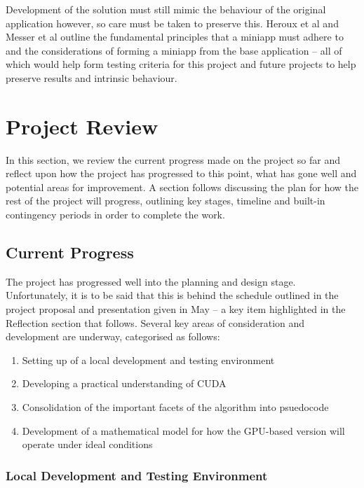\documentclass[conference]{IEEEtran}
\begin{document}
Development of the solution must still mimic the behaviour of the original application however, so care must be taken to preserve this. Heroux et al\cite{miniapps} and Messer et al\cite{messer2015developing} outline the fundamental principles that a miniapp must adhere to and the considerations of forming a miniapp from the base application – all of which would help form testing criteria for this project and future projects to help preserve results and intrinsic behaviour.


\section{Project Review}

In this section, we review the current progress made on the project so far and reflect upon how the project has progressed to this point, what has gone well and potential areas for improvement. A section follows discussing the plan for how the rest of the project will progress, outlining key stages, timeline and built-in contingency periods in order to complete the work.

\subsection{Current Progress}

The project has progressed well into the planning and design stage. Unfortunately, it is to be said that this is behind the schedule outlined in the project proposal and presentation given in May – a key item highlighted in the Reflection section that follows. Several key areas of consideration and development are underway, categorised as follows:

\begin{enumerate}
\item Setting up of a local development and testing environment
\item Developing a practical understanding of CUDA
\item Consolidation of the important facets of the algorithm into psuedocode
\item Development of a mathematical model for how the GPU-based version will operate under ideal conditions
\end{enumerate}


\subsubsection{Local Development and Testing Environment}
\end{document}
